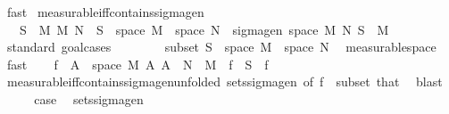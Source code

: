 \begin{isabellebody}
\ fast\isanewline
{}\isamarkupfalse%
%
\endisatagproof
{\isafoldproof}%
%
\isadelimproof
\isanewline
%
\endisadelimproof
\isanewline
{}\isamarkupfalse%
\ measurable{\isacharunderscore}{\kern0pt}iff{\isacharunderscore}{\kern0pt}contains{\isacharunderscore}{\kern0pt}sigma{\isacharunderscore}{\kern0pt}gen{\isacharprime}{\kern0pt}{\isacharcolon}{\kern0pt}\isanewline
\ \ \ {\isachardoublequoteopen}{\isacharparenleft}{\kern0pt}S\ {\isasymsubseteq}\ M\ {\isasymrightarrow}\isactrlsub M\ N{\isacharparenright}{\kern0pt}\ {\isasymlongleftrightarrow}\ S\ {\isasymsubseteq}\ space\ M\ {\isasymrightarrow}\ space\ N\ {\isasymand}\ sigma{\isacharunderscore}{\kern0pt}gen\ {\isacharparenleft}{\kern0pt}space\ M{\isacharparenright}{\kern0pt}\ N\ S\ {\isasymsubseteq}\ M{\isachardoublequoteclose}\isanewline
%
\isadelimproof
%
\endisadelimproof
%
\isatagproof
{}\isamarkupfalse%
\ {\isacharparenleft}{\kern0pt}standard{\isacharcomma}{\kern0pt}\ goal{\isacharunderscore}{\kern0pt}cases{\isacharparenright}{\kern0pt}\isanewline
\ \ \isamarkupfalse%
\ {}\isanewline
\ \ \isamarkupfalse%
\ subset{\isacharcolon}{\kern0pt}\ {\isachardoublequoteopen}S\ {\isasymsubseteq}\ space\ M\ {\isasymrightarrow}\ space\ N{\isachardoublequoteclose}\ \isamarkupfalse%
\ measurable{\isacharunderscore}{\kern0pt}space\ \isamarkupfalse%
\ fast\isanewline
\ \ \isamarkupfalse%
\ {\isachardoublequoteopen}{\isacharbraceleft}{\kern0pt}f\ {\isacharminus}{\kern0pt}{\isacharbackquote}{\kern0pt}\ A\ {\isasyminter}\ space\ M\ {\isacharbar}{\kern0pt}A{\isachardot}{\kern0pt}\ A\ {\isasymin}\ N{\isacharbraceright}{\kern0pt}\ {\isasymsubseteq}\ M{\isachardoublequoteclose}\ \ {\isachardoublequoteopen}f\ {\isasymin}\ S{\isachardoublequoteclose}\ \ f\ \isamarkupfalse%
\ measurable{\isacharunderscore}{\kern0pt}iff{\isacharunderscore}{\kern0pt}contains{\isacharunderscore}{\kern0pt}sigma{\isacharunderscore}{\kern0pt}gen{\isacharbrackleft}{\kern0pt}unfolded\ sets{\isacharunderscore}{\kern0pt}sigma{\isacharunderscore}{\kern0pt}gen{\isacharcomma}{\kern0pt}\ of\ f{\isacharbrackright}{\kern0pt}\ {}\ subset\ that\ \isamarkupfalse%
\ blast\isanewline
\ \ \isamarkupfalse%
\ \isamarkupfalse%
\ {\isacharquery}{\kern0pt}case\ \isamarkupfalse%
\ sets{\isacharunderscore}{\kern0pt}sigma{\isacharunderscore}{\kern0pt}gen\ \isamarkupfalse%

\end{isabellebody}
